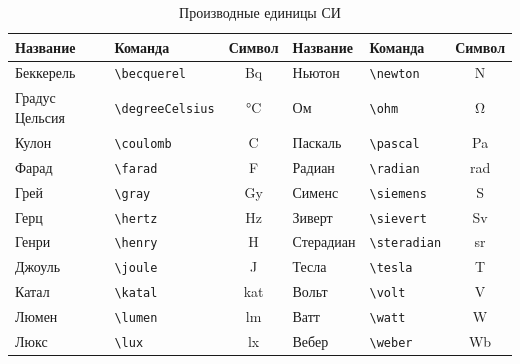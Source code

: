 \begin{table}
    \small
    \centering
    \begin{threeparttable}%
        \caption{Производные единицы СИ}\label{tab:unit:derived}
        \begin{tabular}{llc|llc}
            \toprule
            Название       & Команда                 & Символ              & Название & Команда & Символ \\
            \midrule
            Беккерель      & \verb|\becquerel| & \si{\becquerel}     &
            Ньютон         & \verb|\newton| & \si{\newton}                                      \\
            Градус Цельсия & \verb|\degreeCelsius| & \si{\degreeCelsius} &
            Ом             & \verb|\ohm| & \si{\ohm}                                         \\
            Кулон          & \verb|\coulomb| & \si{\coulomb}       &
            Паскаль        & \verb|\pascal| & \si{\pascal}                                      \\
            Фарад          & \verb|\farad| & \si{\farad}         &
            Радиан         & \verb|\radian| & \si{\radian}                                      \\
            Грей           & \verb|\gray| & \si{\gray}          &
            Сименс         & \verb|\siemens| & \si{\siemens}                                     \\
            Герц           & \verb|\hertz| & \si{\hertz}         &
            Зиверт         & \verb|\sievert| & \si{\sievert}                                     \\
            Генри          & \verb|\henry| & \si{\henry}         &
            Стерадиан      & \verb|\steradian| & \si{\steradian}                                   \\
            Джоуль         & \verb|\joule| & \si{\joule}         &
            Тесла          & \verb|\tesla| & \si{\tesla}                                       \\
            Катал          & \verb|\katal| & \si{\katal}         &
            Вольт          & \verb|\volt| & \si{\volt}                                        \\
            Люмен          & \verb|\lumen| & \si{\lumen}         &
            Ватт           & \verb|\watt| & \si{\watt}                                        \\
            Люкс           & \verb|\lux| & \si{\lux}           &
            Вебер          & \verb|\weber| & \si{\weber}                                       \\
            \bottomrule
        \end{tabular}
    \end{threeparttable}
\end{table}

